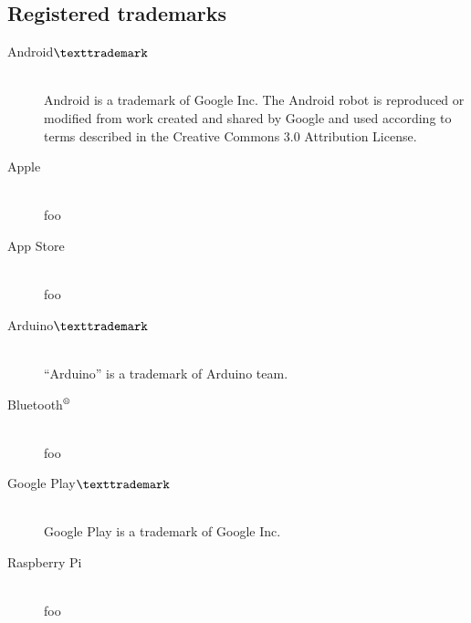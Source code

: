 \subsection{Registered trademarks}

\begin{description}
	\item[Android$\texttrademark$]\hfill \\
		Android is a trademark of Google Inc. \newline
		The Android robot is reproduced or modified from work created and shared by Google and used according to terms described in the Creative Commons 3.0 Attribution License.
	\item[Apple]\hfill \\
		foo
	\item[App Store]\hfill \\
		foo	
	\item[Arduino$\texttrademark$]\hfill \\
		``Arduino'' is a trademark of Arduino team.
	\item[Bluetooth$\textsuperscript{\textregistered}$]\hfill \\
		foo	
	\item[Google Play$\texttrademark$]\hfill \\
		Google Play is a trademark of Google Inc.
	\item[Raspberry Pi]\hfill \\
		foo	
\end{description}
